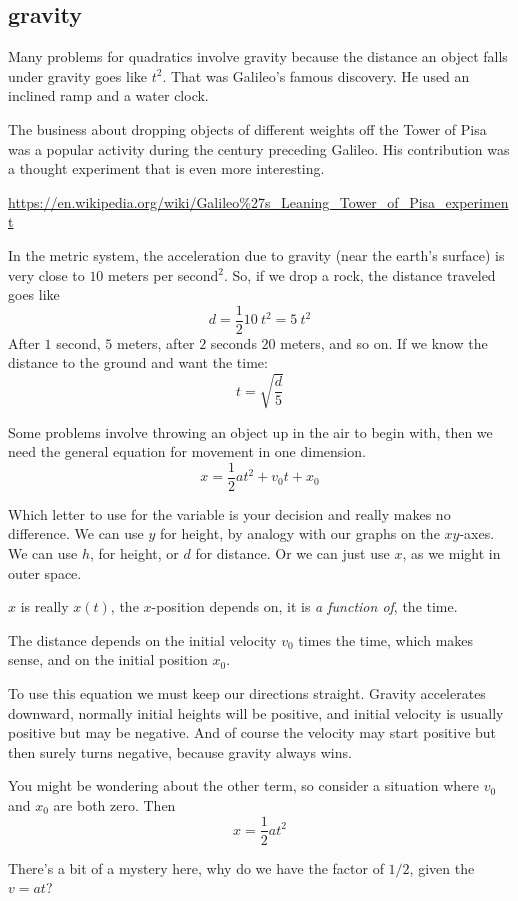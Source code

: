 \documentclass[11pt, oneside]{article}
\begin{document}
\subsection*{gravity}
Many problems for quadratics involve gravity because the distance an object falls under gravity goes like $t^2$.  That was Galileo's famous discovery.  He used an inclined ramp and a water clock.  

The business about dropping objects of different weights off the Tower of Pisa was a popular activity during the century preceding Galileo.  His contribution was a thought experiment that is even more interesting.

\url{https://en.wikipedia.org/wiki/Galileo%27s_Leaning_Tower_of_Pisa_experiment}

In the metric system, the acceleration due to gravity (near the earth's surface) is very close to $10$ meters per second$^2$.  So, if we drop a rock, the distance traveled goes like 
\[ d = \frac{1}{2} 10 \ t^2 = 5 \ t^2 \]
After $1$ second, $5$ meters, after $2$ seconds $20$ meters, and so on.  If we know the distance to the ground and want the time:
\[ t = \sqrt{\frac{d}{5}} \]

Some problems involve throwing an object up in the air to begin with, then we need the general equation for movement in one dimension.
\[ x = \frac{1}{2}at^2 + v_0 t + x_0 \]

Which letter to use for the variable is your decision and really makes no difference.  We can use $y$ for height, by analogy with our graphs on the $xy$-axes.  We can use $h$, for height, or $d$ for distance.  Or we can just use $x$, as we might in outer space.

$x$ is really $x(t)$, the $x$-position depends on, it is \emph{a function of}, the time.  

The distance depends on the initial velocity $v_0$ times the time, which makes sense, and on the initial position $x_0$.

To use this equation we must keep our directions straight.  Gravity accelerates downward, normally initial heights will be positive, and initial velocity is usually positive but may be negative.  And of course the velocity may start positive but then surely turns negative, because gravity always wins.

You might be wondering about the other term, so consider a situation where $v_0$ and $x_0$ are both zero.  Then
\[ x = \frac{1}{2}at^2 \]

There's a bit of a mystery here, why do we have the factor of $1/2$, given the $v = at$?  
\end{document}
